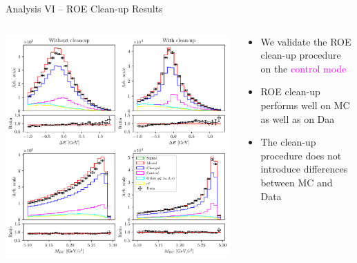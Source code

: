 \documentclass[serif]{beamer}
\begin{document}

\begin{frame}[t]{Analysis VI -- ROE Clean-up Results}
\vspace{-3mm}
\small

\begin{columns}
	\includegraphics[width=\textwidth]{fig/roe_val}
	\begin{block}{}
	\begin{itemize}
		\item We validate the ROE clean-up procedure on the \textcolor{magenta}{control mode}
		\item ROE clean-up performs well on MC as well as on Daa
		\item The clean-up procedure does not introduce differences between MC and Data
	\end{itemize}
	\end{block}
\end{columns}


\end{frame}



\end{document}

